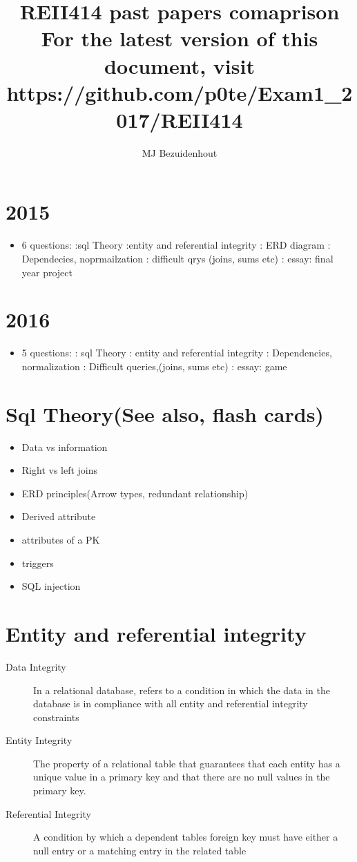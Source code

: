 \documentclass{article}
\title{REII414 past papers comaprison\\ \small
For the latest version of this document, visit https://github.com/p0te/Exam1\_2017/REII414}
\author{MJ Bezuidenhout}
\begin{document}
\maketitle
\section{2015}
\begin{itemize}
	\item 6 questions:
		:sql Theory
		:entity and referential integrity
		: ERD diagram
		: Dependecies, noprmailzation
		: difficult qrys (joins, sums etc)
		: essay: final year project
\end{itemize}
\section{2016}
\begin{itemize}
	\item 5 questions:
		: sql Theory 
		: entity and referential integrity
		: Dependencies, normalization
		: Difficult queries,(joins, sums etc)
		: essay: game
\end{itemize}
\section{Sql Theory(See also, flash cards)}
\begin{itemize}
	\item Data vs information
	\item Right vs left joins
	\item ERD principles(Arrow types, redundant relationship)
	\item Derived attribute
	\item attributes of a PK
	\item triggers
	\item SQL injection
\end{itemize}
\section{Entity and referential integrity}
\begin{description}
	\item[Data Integrity] In a relational database, refers to a condition
in which the data in the database is in compliance with all entity and referential integrity constraints 
	\item[Entity Integrity]  The property of a relational table that guarantees that each entity has a unique value in a
primary key and that there are no null values in
the primary key.
	\item[Referential Integrity] A condition by which a dependent tables foreign key must have either a null entry or a matching entry in the related table
\end{description}
\end{document}
